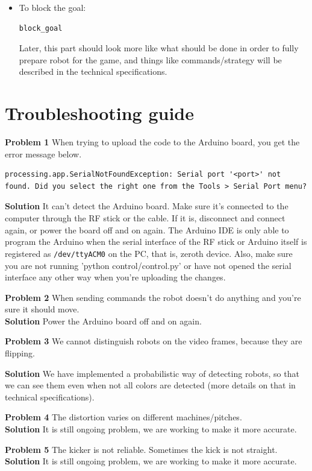 \documentclass[12pt]{article}
\begin{document}
\begin{itemize}
\item To block the goal:
\begin{lstlisting}
block_goal
\end{lstlisting}

Later, this part should look more like what should be done in order to fully prepare robot for the game, and things like commands/strategy will be described in the technical specifications.

\end{itemize}

\section{Troubleshooting guide}
\textbf{Problem 1} When trying to upload the code to the Arduino board, you get the error message below.
\begin{lstlisting}
processing.app.SerialNotFoundException: Serial port '<port>' not found. Did you select the right one from the Tools > Serial Port menu?
\end{lstlisting}

\bigskip

\textbf{Solution}  It can't detect the Arduino board. Make sure it's connected to the computer through the RF stick or the cable. If it is, disconnect and connect again, or power the board off and on again. The Arduino IDE is only able to program the Arduino when the serial interface of the RF stick or Arduino itself is registered as \texttt{/dev/ttyACM0} on the PC, that is, zeroth device. Also, make sure you are not running 'python control/control.py' or have not opened the serial interface any other way when you're uploading the changes.
\bigskip

\textbf{Problem 2} When sending commands the robot doesn't do anything and you're sure it should move.
\\\textbf{Solution} Power the Arduino board off and on again.
\bigskip

\textbf{Problem 3} We cannot distinguish robots on the video frames, because they are flipping.

\textbf{Solution} We have implemented a probabilistic way of detecting robots, so that we can see them even when not all colors are detected (more details on that in technical specifications).
\bigskip

\textbf{Problem 4} The distortion varies on different machines/pitches.
\\\textbf{Solution} It is still ongoing problem, we are working to make it more accurate.
\bigskip

\textbf{Problem 5} The kicker is not reliable. Sometimes the kick is not straight.
\\\textbf{Solution} It is still ongoing problem, we are working to make it more accurate.
\end{document}
